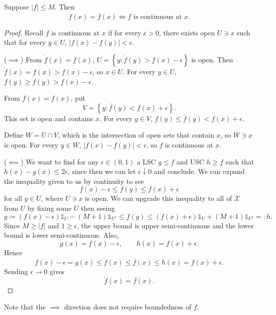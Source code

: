 \begin{theorem} \label{2-10-1}
	Suppose $\left| f \right| \le M$. Then \[
		\mathring{f}(x) = \overline{f}(x) \iff f \text{ is continuous at }x
	.\] 
\end{theorem}
\begin{proof}
	Recall $f$ is continuous at $x$ if for every $\epsilon > 0$, there exists open $U \ni x$ such that for every $y \in U$, $\left| f(x) - f(y) \right| < \epsilon$.

	($\implies$) From $\mathring{f}(x) = f(x)$, $U = \left\{y : \mathring{f}(y) > f(x) -\epsilon\right\}$ is open. Then $\mathring{f}(x) = f(x) > f(x) - \epsilon$, so $x \in U$.
	For every $y \in U$, $f(y) \ge \mathring{f}(y) > f(x) -\epsilon$.

	From $\overline{f}(x) = f(x)$, put
	\[
		V = \left\{y : \overline{f}(y) < f(x) + \epsilon\right\}.
	\]
	This set is open and contains $x$.
	For every $y \in V$, $f(y) \le \overline{f}(y) < f(x) + \epsilon$.

	Define $W = U \cap V$, which is the intersection of open sets that contain $x$, so $W \ni x$ is open. For every $y \in W$, $\left| f(x) - f(y) \right| < \epsilon$, so $f$ is continuous at $x$.

	($\impliedby$) 
	We want to find for any $\epsilon \in (0,1)$ a LSC $g \le f$ and USC $h \ge f$ such that $h(x) - g(x) \le 2\epsilon$, since then we can let $\epsilon \downarrow 0$ and conclude.
	We can expand the inequality given to us by continuity to see \[
		f(x) - \epsilon \le f(y) \le f(x) + \epsilon
	\] for all $y \in U$, where $U \ni x$ is open.
	We can upgrade this inequality to all of $\mathscr{X}$ from $U$ by fixing some $U$ then seeing \[
		g \coloneqq \left( f(x) -\epsilon \right)\mathds{1}_{U} -(M+1)\mathds{1}_{U^{c}} \le f(y) \le \left( f(x) + \epsilon \right) \mathds{1}_{U} + \left( M+1 \right)\mathds{1}_{U^{c}} =: h
	.\] Since $M \ge \left| f \right|$ and $1 \ge \epsilon$, the upper bound is upper semi-continuous and the lower bound is lower semi-continuous. Also,
	\[
		g(x) = f(x) - \epsilon,
		\qquad
		h(x) = f(x) + \epsilon.
	\]
	Hence
	\[
		f(x) - \epsilon = g(x) \le \mathring{f}(x) \le \overline{f}(x) \le h(x) = f(x) + \epsilon.
	\]
	Sending $\epsilon \to 0$ gives \[
		\mathring{f}(x) = \overline{f}(x)
	.\] 
\end{proof}

Note that the $\implies$ direction does not require boundedness of $f$.

